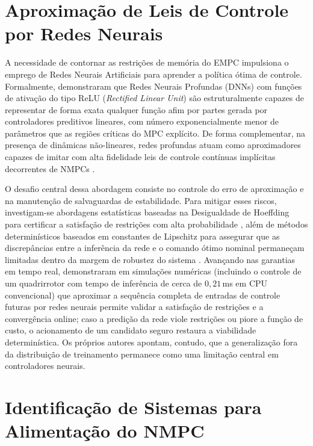 \section{Aproximação de Leis de Controle por Redes Neurais}
\label{sec:fund_ann_mpc}

A necessidade de contornar as restrições de memória do EMPC impulsiona o emprego de Redes Neurais Artificiais para aprender a política ótima de controle. Formalmente,  demonstraram que Redes Neurais Profundas (DNNs) com funções de ativação do tipo ReLU (\textit{Rectified Linear Unit}) são estruturalmente capazes de representar de forma exata qualquer função afim por partes gerada por controladores preditivos lineares, com número exponencialmente menor de parâmetros que as regiões críticas do MPC explícito. De forma complementar, na presença de dinâmicas não-lineares, redes profundas atuam como aproximadores capazes de imitar com alta fidelidade leis de controle contínuas implícitas decorrentes de NMPCs \cite{nubert2020safe}.

O desafio central dessa abordagem consiste no controle do erro de aproximação e na manutenção de salvaguardas de estabilidade. Para mitigar esses riscos, investigam-se abordagens estatísticas baseadas na Desigualdade de Hoeffding para certificar a satisfação de restrições com alta probabilidade \cite{hertneck2018}, além de métodos determinísticos baseados em constantes de Lipschitz para assegurar que as discrepâncias entre a inferência da rede e o comando ótimo nominal permaneçam limitadas dentro da margem de robustez do sistema \cite{alsmeier2024}. Avançando nas garantias em tempo real,  demonstraram em simulações numéricas (incluindo o controle de um quadrirrotor com tempo de inferência de cerca de $0{,}21$\,ms em CPU convencional) que aproximar a sequência completa de entradas de controle futuras por redes neurais permite validar a satisfação de restrições e a convergência online; caso a predição da rede viole restrições ou piore a função de custo, o acionamento de um candidato seguro restaura a viabilidade determinística. Os próprios autores apontam, contudo, que a generalização fora da distribuição de treinamento permanece como uma limitação central em controladores neurais.

\section{Identificação de Sistemas para Alimentação do NMPC}
\label{sec:fund_sysid}

